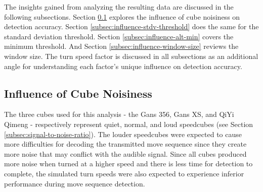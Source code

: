 The insights gained from analyzing the resulting data are discussed in
the following subsections. Section
\ref{subsec:influence-cube-noisiness} explores the influence of cube
noisiness on detection accuracy. Section
\ref{subsec:influence-stdv-threshold} does the same for the standard
deviation threshold. Section \ref{subsec:influence-alt-min} covers the
minimum threshold. And Section \ref{subsec:influence-window-size}
reviews the window size. The turn speed factor is discussed in all
subsections as an additional angle for understanding each factor's
unique influence on detection accuracy.

\subsection{Influence of Cube Noisiness}
\label{subsec:influence-cube-noisiness}

The three cubes used for this analysis - the Gans 356, Gans XS, and
QiYi Qimeng - respectively represent quiet, normal, and loud speedcubes
(see Section \ref{subsec:signal-to-noise-ratio}). The louder speedcubes
were expected to cause more difficulties for decoding the transmitted
move sequence since they create more noise that may conflict with the
audible signal. Since all cubes produced more noise when turned at a
higher speed and there is less time for detection to complete, the
simulated turn speeds were also expected to experience inferior
performance during move sequence detection.

